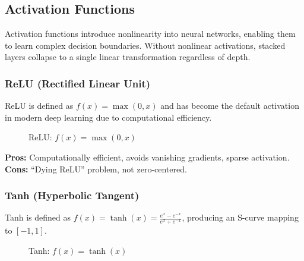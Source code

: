 \documentclass[12pt,a4paper]{report}
\begin{document}
\subsection{Activation Functions}

Activation functions introduce nonlinearity into neural networks, enabling them to learn complex decision boundaries. Without nonlinear activations, stacked layers collapse to a single linear transformation regardless of depth.

\subsubsection{ReLU (Rectified Linear Unit)}

ReLU is defined as $f(x) = \max(0, x)$ and has become the default activation in modern deep learning due to computational efficiency.

\begin{figure}[H]
\centering
{}
\caption{ReLU: $f(x) = \max(0, x)$}
\label{fig:relu}
\end{figure}

\textbf{Pros:} Computationally efficient, avoids vanishing gradients, sparse activation. \textbf{Cons:} ``Dying ReLU'' problem, not zero-centered.

\subsubsection{Tanh (Hyperbolic Tangent)}

Tanh is defined as $f(x) = \tanh(x) = \frac{e^x - e^{-x}}{e^x + e^{-x}}$, producing an S-curve mapping to $[-1, 1]$.

\begin{figure}[H]
\centering
{}
\caption{Tanh: $f(x) = \tanh(x)$}
\label{fig:tanh}
\end{figure}
\end{document}
